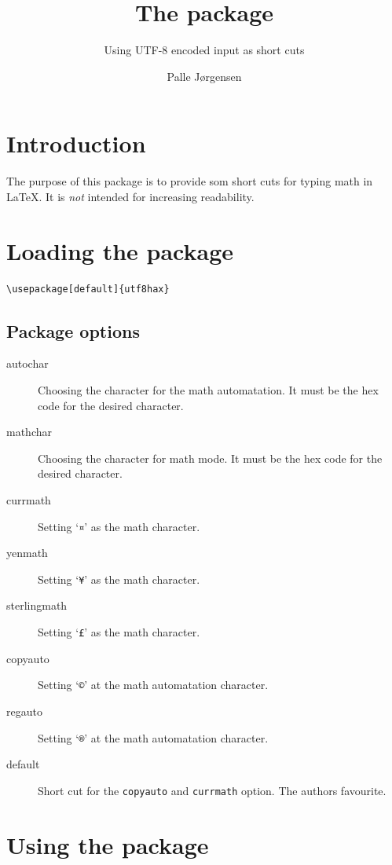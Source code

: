 \documentclass[a4paper,british,parskip=half,11pt,fleqn]{scrartcl}
\author{Palle J\o rgensen} %
\title{The \texttt{\jobname} package} %
\subtitle{Using UTF-8 encoded input as short cuts} %
\begin{document}
\maketitle

\section{Introduction}
\label{sec:introduction}

The purpose of this package is to provide som short cuts for typing
math in \LaTeX. It is \emph{not} intended for increasing readability.

\section{Loading the package}
\label{sec:loading-package}

\begin{lstlisting}
\usepackage[default]{utf8hax}
\end{lstlisting}

\subsection{Package options}
\label{sec:package-options}

\begin{description}
\item[autochar] Choosing the character for the math automatation. It
  must be the hex code for the desired character.
\item[mathchar] Choosing the character for math mode. It must be the
  hex code for the desired character.
\item[currmath] Setting `\verb|¤|' as the math character.
\item[yenmath]  Setting `\verb|¥|' as the math character.
\item[sterlingmath] Setting `\verb|£|' as the math character.
\item[copyauto] Setting `\verb|©|' at the math automatation character.
\item[regauto] Setting `\verb|®|' at the math automatation character.
\item[default] Short cut for the \verb|copyauto| and \verb|currmath|
  option. The authors favourite.
\end{description}

\section{Using the package}
\label{sec:using-package}
\end{document}
